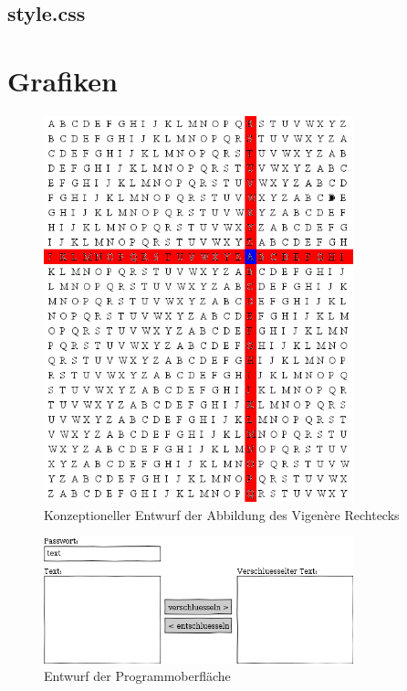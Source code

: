 \documentclass[11pt,paper=a4,final]{scrartcl}
\begin{document}
\subsection{style.css}
\lstset{language=CSS,frame=single,breaklines=true}

\section{Grafiken}
\begin{figure}[h!]
  \centering
  \includegraphics[width=0.8\textwidth]{select.png}
  \caption{Konzeptioneller Entwurf der Abbildung des Vigen\`ere Rechtecks}
  \label{fig:select}
\end{figure}
\begin{figure}[h!]
  \centering
  \includegraphics[width=0.8\textwidth]{interface.png}
  \caption{Entwurf der Programmoberfl\"ache}
  \label{fig:interface}
\end{figure}
\end{document}
